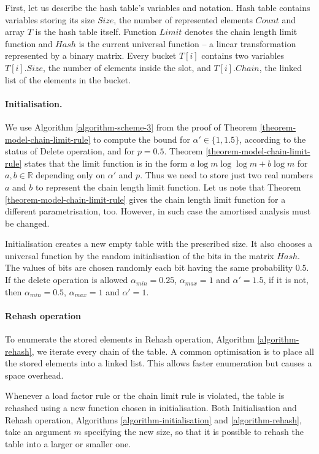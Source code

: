 First, let us describe the hash table's variables and notation. Hash table contains variables storing its size $Size$, the number of represented elements $Count$ and array $T$ is the hash table itself. Function $Limit$ denotes the chain length limit function and $Hash$ is the current universal function -- a linear transformation represented by a binary matrix. Every bucket $T[i]$ contains two variables $T[i].Size$, the number of elements inside the slot, and $T[i].Chain$, the linked list of the elements in the bucket.

\paragraph*{Initialisation.} We use Algorithm \ref{algorithm-scheme-3} from the proof of Theorem \ref{theorem-model-chain-limit-rule} to compute the bound for $\alpha' \in \{1, 1.5\}$, according to the status of Delete operation, and for $p = 0.5$. Theorem \ref{theorem-model-chain-limit-rule} states that the limit function is in the form $a \log m \log \log m + b \log m$ for $a, b \in \mathbb{R}$ depending only on $\alpha'$ and $p$. Thus we need to store just two real numbers $a$ and $b$ to represent the chain length limit function. Let us note that Theorem \ref{theorem-model-chain-limit-rule} gives the chain length limit function for a different parametrisation, too. However, in such case the amortised analysis must be changed. 

Initialisation creates a new empty table with the prescribed size. It also chooses a universal function by the random initialisation of the bits in the matrix $Hash$. The values of bits are chosen randomly each bit having the same probability $0.5$. If the delete operation is allowed $\alpha_{min} = 0.25$, $\alpha_{max} = 1$ and $\alpha' = 1.5$, if it is not, then $\alpha_{min} = 0.5$, $\alpha_{max} = {1}$ and $\alpha' = 1$.



\paragraph*{Rehash operation}
To enumerate the stored elements in Rehash operation, Algorithm \ref{algorithm-rehash}, we iterate every chain of the table. A common optimisation is to place all the stored elements into a linked list. This allows faster enumeration but causes a space overhead.

Whenever a load factor rule or the chain limit rule is violated, the table is rehashed using a new function chosen in initialisation. Both Initialisation and Rehash operation, Algorithms \ref{algorithm-initialisation} and \ref{algorithm-rehash}, take an argument $m$ specifying the new size, so that it is possible to rehash the table into a larger or smaller one.

